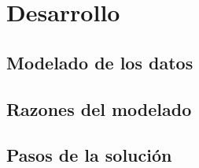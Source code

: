 \section{Desarrollo}

\subsection{Modelado de los datos}


\subsection{Razones del modelado}



\subsection{Pasos de la solución}
